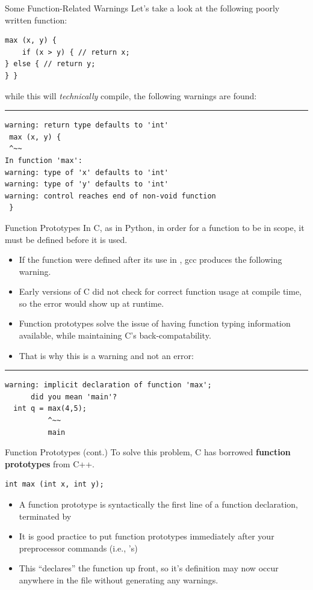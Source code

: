 \documentclass[11pt]{beamer}
\let\OldTexttt\texttt
\renewcommand{\texttt}[1]{\OldTexttt{\color{teal}{#1}}}
\begin{document}
\begin{frame}[fragile=singleslide]{Some Function-Related Warnings}
Let's take a look at the following poorly written function:
\begin{lstlisting}[style=C]
max (x, y) {
	if (x > y) { // return x;
} else { // return y; 
} }
\end{lstlisting}
while this will \emph{technically} compile, the following warnings are found:
\hrule\small
\begin{lstlisting}[style=terminal]
warning: return type defaults to 'int' 
 max (x, y) {
 ^~~
In function 'max':
warning: type of 'x' defaults to 'int' 
warning: type of 'y' defaults to 'int' 
warning: control reaches end of non-void function 
 }
\end{lstlisting}
\end{frame}

\begin{frame}[fragile=singleslide]{Function Prototypes}
In C, as in Python, in order for a function to be in scope, it must be defined before it is used.  
\begin{itemize}
\item If the function \texttt{max} were defined after its use in \texttt{main}, gcc produces the following warning.
\item Early versions of C did not check for correct function usage at compile time, so the error would show up at runtime.
\item Function prototypes solve the issue of having function typing information available, while maintaining C's back-compatability.
\item That is why this is a warning and not an error:
\end{itemize}
\hrule
\begin{lstlisting}[style=terminal]
warning: implicit declaration of function 'max';
      did you mean 'main'? 
  int q = max(4,5);
          ^~~
          main
\end{lstlisting}
\end{frame}

\begin{frame}[fragile=singleslide]{Function Prototypes (cont.)}
To solve this problem, C has borrowed \textbf{function prototypes} from C++.
\begin{lstlisting}[style=C]
int max (int x, int y);
\end{lstlisting}
\begin{itemize}
\item A function prototype is syntactically the first line of a function declaration, terminated by \texttt{;}
\item It is good practice to put function prototypes immediately after your preprocessor commands (i.e., \texttt{\#include}'s)
\item This ``declares'' the function up front, so it's definition may now occur anywhere in the file without generating any warnings.  
\end{itemize}
\end{frame}
\end{document}
